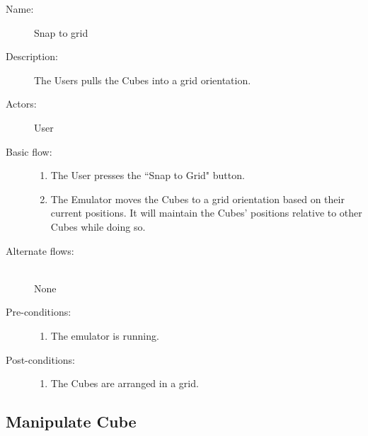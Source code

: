 \documentclass[12pt]{article}
\begin{document}
    \begin{description}
      \item[Name:] Snap to grid
      \item[Description:] The Users pulls the Cubes into a grid orientation.
      \item[Actors:] User
      \item[Basic flow:] \hfill
        \begin{enumerate}
	  \item{The User presses the ``Snap to Grid" button.}
	  \item{The Emulator moves the Cubes to a grid orientation based on their current positions. It will maintain the Cubes' positions relative to other Cubes while doing so.}
        \end{enumerate}
      \item[Alternate flows:] \hfill \\
	None	
      \item[Pre-conditions:] \hfill
        \begin{enumerate}
	  \item{The emulator is running.}
        \end{enumerate}
      \item[Post-conditions:] \hfill
        \begin{enumerate}
	  \item{The Cubes are arranged in a grid.}
        \end{enumerate}
    \end{description}

  \subsection{Manipulate Cube}
\end{document}
